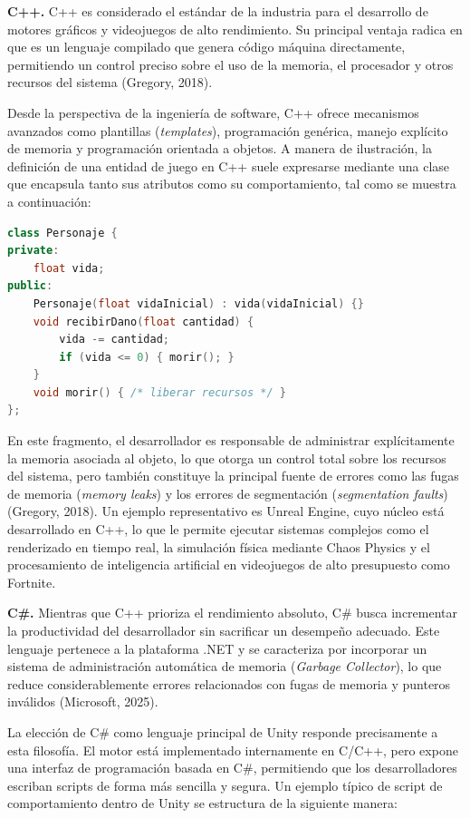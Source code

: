 \documentclass[12pt]{report}
\begin{document}
\textbf{C++.} C++ es considerado el estándar de la industria para el desarrollo de motores gráficos y videojuegos de alto rendimiento. Su principal ventaja radica en que es un lenguaje compilado que genera código máquina directamente, permitiendo un control preciso sobre el uso de la memoria, el procesador y otros recursos del sistema (Gregory, 2018).

Desde la perspectiva de la ingeniería de software, C++ ofrece mecanismos avanzados como plantillas (\textit{templates}), programación genérica, manejo explícito de memoria y programación orientada a objetos. A manera de ilustración, la definición de una entidad de juego en C++ suele expresarse mediante una clase que encapsula tanto sus atributos como su comportamiento, tal como se muestra a continuación:

\begin{lstlisting}[language=C++]
class Personaje {
private:
    float vida;
public:
    Personaje(float vidaInicial) : vida(vidaInicial) {}
    void recibirDano(float cantidad) {
        vida -= cantidad;
        if (vida <= 0) { morir(); }
    }
    void morir() { /* liberar recursos */ }
};
\end{lstlisting}

En este fragmento, el desarrollador es responsable de administrar explícitamente la memoria asociada al objeto, lo que otorga un control total sobre los recursos del sistema, pero también constituye la principal fuente de errores como las fugas de memoria (\textit{memory leaks}) y los errores de segmentación (\textit{segmentation faults}) (Gregory, 2018). Un ejemplo representativo es Unreal Engine, cuyo núcleo está desarrollado en C++, lo que le permite ejecutar sistemas complejos como el renderizado en tiempo real, la simulación física mediante Chaos Physics y el procesamiento de inteligencia artificial en videojuegos de alto presupuesto como Fortnite.

\textbf{C\#.} Mientras que C++ prioriza el rendimiento absoluto, C\# busca incrementar la productividad del desarrollador sin sacrificar un desempeño adecuado. Este lenguaje pertenece a la plataforma .NET y se caracteriza por incorporar un sistema de administración automática de memoria (\textit{Garbage Collector}), lo que reduce considerablemente errores relacionados con fugas de memoria y punteros inválidos (Microsoft, 2025).

La elección de C\# como lenguaje principal de Unity responde precisamente a esta filosofía. El motor está implementado internamente en C/C++, pero expone una interfaz de programación basada en C\#, permitiendo que los desarrolladores escriban scripts de forma más sencilla y segura. Un ejemplo típico de script de comportamiento dentro de Unity se estructura de la siguiente manera:
\end{document}

